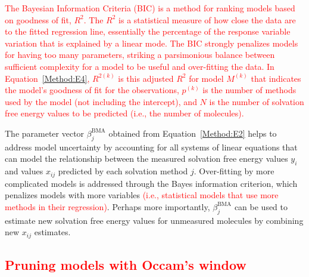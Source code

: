 \documentclass[journal=jpcbfk, manuscript=article]{achemso}
\newcommand{\+}[1]{\ensuremath{\mathbf{#1}}}
\newcommand{\rev}[1]{\textsf{\textcolor{red}{#1}}}
\begin{document}
\rev{The Bayesian Information Criteria (BIC) is a method for ranking models based on goodness of fit, $R^2$.
The $R^2$ is a statistical measure of how close the data are to the fitted regression line, essentially the percentage of the response variable variation that is explained by a linear mode.
The BIC strongly penalizes models for having too many parameters, striking a parsimonious balance between sufficient complexity for a model to be useful and over-fitting the data. 
In Equation~\ref{Method:E4},  $R^{2(k)}$ is this adjusted $R^2$ for model $M^{(k)}$ that indicates the model's goodness of fit for the observations, $p^{(k)}$ is the number of methods used by the model (not including the intercept), and $N$ is the number of solvation free energy values to be predicted (i.e., the number of molecules).}

The parameter vector $\beta_j^{\text{BMA}}$ obtained from Equation~\ref{Method:E2} helps to address model uncertainty by accounting for all systems of linear equations that can model the relationship between the measured solvation free energy values $y_i$ and values $x_{ij}$ predicted by each solvation method $j$.
Over-fitting by more complicated models is addressed through the Bayes information criterion, which penalizes models with more variables \rev{(i.e., statistical models that use more methods in their regression)}.
Perhaps more importantly, $\beta_j^{\text{BMA}}$ can be used to estimate new solvation free energy values for unmeasured molecules by combining new $x_{i j}$ estimates.

\subsection{\rev{Pruning models with Occam's window}} \label{Method:StatEnsemble}
\end{document}
